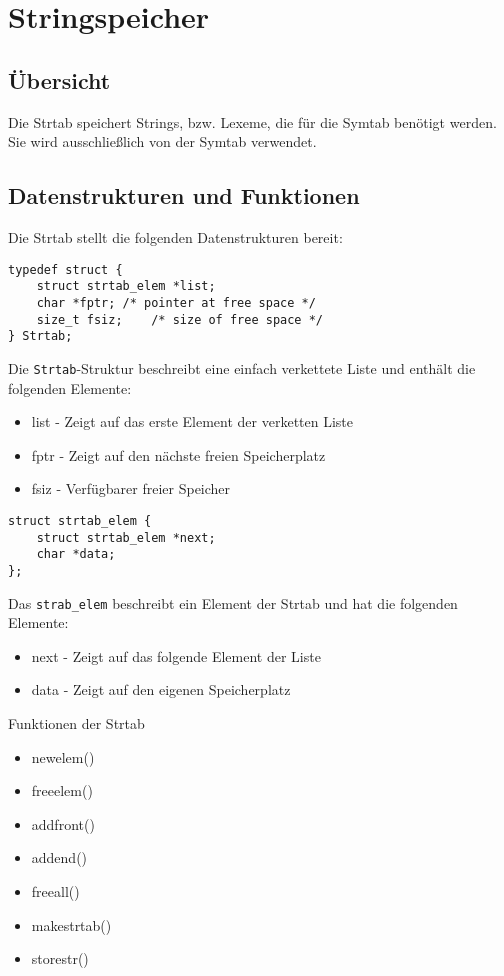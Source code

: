 \chapter{Stringspeicher}
\label{chap:strtab}

\section{Übersicht}
\label{sec:strtab_overview}

Die Strtab speichert Strings, bzw. Lexeme, die für die Symtab benötigt werden. Sie wird ausschließlich von der Symtab verwendet.

\section{Datenstrukturen und Funktionen}
\label{sec:strtab_datafunc}

Die Strtab stellt die folgenden Datenstrukturen bereit:
\begin{lstlisting}
typedef struct {
	struct strtab_elem *list;
	char *fptr;	/* pointer at free space */
	size_t fsiz;	/* size of free space */
} Strtab;
\end{lstlisting}
Die \texttt{Strtab}-Struktur beschreibt eine einfach verkettete Liste und 
enthält die folgenden Elemente:
\begin{itemize}
\item{list} - Zeigt auf das erste Element der verketten Liste
\item{fptr} - Zeigt auf den nächste freien Speicherplatz
\item{fsiz} - Verfügbarer freier Speicher
\end{itemize}

\begin{lstlisting}
struct strtab_elem {
	struct strtab_elem *next;
	char *data;
};
\end{lstlisting}
Das \texttt{strab\_elem} beschreibt ein Element der Strtab  und hat die folgenden Elemente:
\begin{itemize}
\item{next} - Zeigt auf das folgende Element der Liste
\item{data} - Zeigt auf den eigenen Speicherplatz 
\end{itemize}


Funktionen der Strtab
\begin{itemize}
\item{newelem()}
\item{freeelem()}
\item{addfront()}
\item{addend()}
\item{freeall()}
\item{makestrtab()}
\item{storestr()}
\end{itemize}

